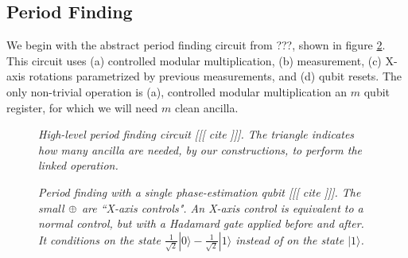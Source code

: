 \documentclass[twocolumn]{article}
\begin{document}
\subsection{Period Finding}

We begin with the abstract period finding circuit from ???, shown in figure \ref{fig:period-finding-solo-phase-qubit}.
This circuit uses (a) controlled modular multiplication, (b) measurement, (c) X-axis rotations parametrized by previous measurements, and (d) qubit resets.
The only non-trivial operation is (a), controlled modular multiplication an $m$ qubit register, for which we will need $m$ clean ancilla.

\begin{figure}
  \centering
  \caption{\em
	High-level period finding circuit [[[ cite ]]].
    The triangle indicates how many ancilla are needed, by our constructions, to perform the linked operation.
  }
  \label{fig:period-finding}
\end{figure}

\begin{figure}
  \centering
  \caption{\em
	Period finding with a single phase-estimation qubit [[[ cite ]]].
	The small $\tiny \oplus$ are ``X-axis controls".
	An X-axis control is equivalent to a normal control, but with a Hadamard gate applied before and after.
	It conditions on the state $\frac{1}{\sqrt 2}|0\rangle - \frac{1}{\sqrt 2}|1\rangle$ instead of on the state $|1\rangle$.
  }
  \label{fig:period-finding-solo-phase-qubit}
\end{figure}
\end{document}
